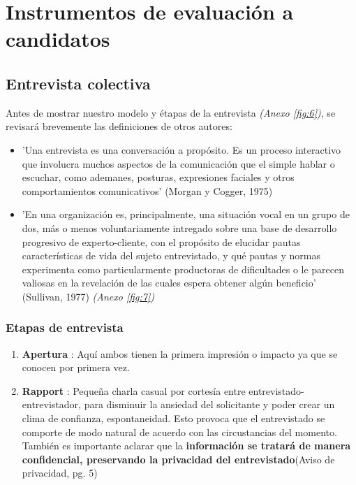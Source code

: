 \documentclass[letterpaper,12pt]{article}
\begin{document}
\begin{sloppypar}
\section{\textcolor[rgb]{0.4,0.4,0.9}{Instrumentos de evaluación a candidatos}} 
\subsection{Entrevista colectiva}
Antes de mostrar nuestro modelo y étapas de la entrevista \textit{(Anexo \ref{fig:6})}, se revisará brevemente las definiciones de otros autores: 
\begin{itemize}
    \item 'Una entrevista es una conversación a propósito. Es un proceso interactivo que involucra muchos aspectos de la comunicación que el simple hablar o escuchar, como ademanes, posturas, expresiones faciales y otros comportamientos comunicativos' (Morgan y Cogger, 1975)
    \item 'En una organización es, principalmente, una situación vocal en un grupo de dos, más o menos voluntariamente intregado sobre una base de desarrollo progresivo de experto-cliente, con el propósito de elucidar pautas características de vida del sujeto entrevistado, y qué pautas y normas experimenta como particularmente productoras de dificultades o le parecen valiosas en la revelación de las cuales espera obtener algún beneficio' (Sullivan, 1977) \textit{(Anexo \ref{fig:7})}
\end{itemize}
\subsubsection{Etapas de entrevista}
\begin{enumerate}
    \item \textbf{Apertura} :  Aquí ambos tienen la primera impresión o impacto ya que se conocen por primera vez. 
    \item \textbf{Rapport} : Pequeña charla casual por cortesía entre entrevistado-entrevistador, para disminuir la ansiedad del solicitante y poder crear un clima de confianza, espontaneidad. Esto provoca que el entrevistado se comporte de modo natural de acuerdo con las circustancias del momento. También es importante aclarar que la \textbf{información se tratará de manera confidencial, preservando la privacidad del entrevistado}(Aviso de privacidad, pg. 5) %
    

\end{enumerate}
\end{sloppypar}
\end{document}

